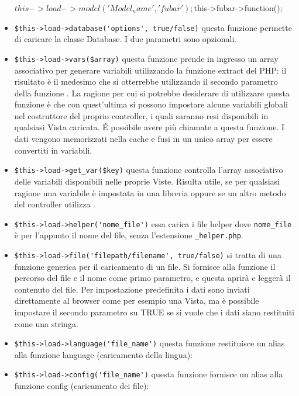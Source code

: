 \begin{itemize}
\begin{code}
$this->load->model('Model_name', 'fubar');

$this->fubar->function();
\end{code}

\item \verb|$this->load->database('options', true/false)| questa funzione permette di caricare la classe Database. I due parametri sono opzionali.

\item \verb|$this->load->vars($array)| questa funzione prende in ingresso un array associativo per generare variabili utilizzando la funzione extract del PHP: il risultato è il medesimo che si otterrebbe utilizzando il secondo parametro della funzione . La ragione per cui si potrebbe desiderare di utilizzare questa funzione è che con quest'ultima si possono impostare alcune variabili globali nel costruttore del proprio controller, i quali saranno resi disponibili in qualsiasi Vista caricata. \'E possibile avere più chiamate a questa funzione. I dati vengono memorizzati nella cache e fusi in un unico array per essere convertiti in variabili.

\item \verb|$this->load->get_var($key)| questa funzione controlla l'array associativo delle variabili disponibili nelle proprie Viste. Risulta utile, se per qualsiasi ragione una variabile è impostata in una libreria oppure se un altro metodo del controller utilizza .

\item \verb|$this->load->helper('nome_file')| essa carica i file helper dove \verb|nome_file| è per l'appunto il nome del file, senza l'estensione \verb|_helper.php|.

\item \verb|$this->load->file('filepath/filename', true/false)| si tratta di una funzione generica per il caricamento di un file. Si fornisce alla funzione il percorso del file e il nome come primo parametro, e questa aprirà e leggerà il contenuto del file. Per impostazione predefinita i dati sono inviati direttamente al browser come per esempio una Vista, ma è possibile impostare il secondo parametro su TRUE se si vuole che i dati siano restituiti come una stringa.

\item \verb|$this->load->language('file_name')| questa funzione restituisce un alias alla funzione language (caricamento della lingua):


\item \verb|$this->load->config('file_name')| questa funzione fornisce un alias alla funzione config (caricamento dei file):

\end{itemize}

